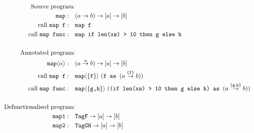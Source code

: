 \documentclass[a4paper,UKenglish,cleveref, autoref, thm-restate]{template/lipics-v2021}
\begin{document}
\begin{figure}[ht]
  \centering
  \begin{align*}
    \text{Source program:}                  &                                                                                                                                             \\
    \texttt{map} :\quad                     & (a\to b) \to [a] \to [b]                                                                                                                    \\
    \text{call \texttt{map f}}:\quad        & \texttt{map f}                                                                                                                              \\
    \text{call \texttt{map func}}:\quad     & \texttt{map if len(xs) > 10 then g else h}                                                                                                  \\
    \\
    \text{Annotated program:}               &                                                                                                                                             \\
    \texttt{map}\langle\alpha\rangle :\quad & (a\stackrel\alpha\to b) \to [a] \to [b]                                                                                                     \\
    \text{call \texttt{map f}}:\quad        & \texttt{map}\langle\{\texttt{f}\}\rangle\ (\texttt{f as } (a\stackrel{\{\texttt{f}\}}{\to}  b))                                             \\
    \text{call \texttt{map func}}:\quad     & \texttt{map}\langle\{\texttt{g,h}\}\rangle\ (\texttt{(if len(xs) > 10 then g else h) as } (a\stackrel{\{\texttt{g}, \texttt{h}\}}{\to}  b)) \\
    \\
    \text{Defunctionalised program:}        &                                                                                                                                             \\
    \texttt{map1} :\quad                    & \texttt{TagF} \to [a] \to [b]                                                                                                               \\
    \texttt{map2} :\quad                    & \texttt{TagGH} \to [a] \to [b]                                                                                                              \\

\end{align*}
\end{figure}
\end{document}
